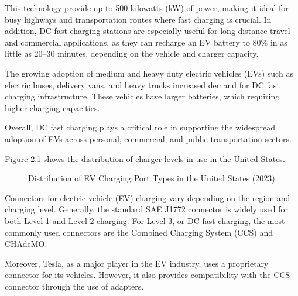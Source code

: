 \begin{itemize}
    
    This technology provide up to 500 kilowatts (kW) of power, making it ideal for busy highways and transportation routes where fast charging is crucial\cite{Alternative Fuels Data Center}.
    In addition, DC fast charging stations are especially useful for long-distance travel and commercial applications, as they can recharge an EV battery to 80\% in as little as 20–30 minutes, depending on the vehicle and charger capacity\cite{Alternative Fuels Data Center}.

    The growing adoption of medium and heavy duty electric vehicles (EVs) such as electric buses, delivery vans, and heavy trucks increased demand for DC fast charging infrastructure. These vehicles have larger batteries, which requiring higher charging capacities. 
    
    Overall, DC fast charging plays a critical role in supporting the widespread adoption of EVs across personal, commercial, and public transportation sectors.
\end{itemize}

Figure 2.1 shows the distribution of charger levels in use in the United States\cite{Alternative Fuels Data Center}.

\begin{figure}[h!]
\centering
{}
\caption{Distribution of EV Charging Port Types in the United States (2023)}
\end{figure}

Connectors for electric vehicle (EV) charging vary depending on the region and charging level. Generally, the standard SAE J1772 connector is widely used for both Level 1 and Level 2 charging. For Level 3, or DC fast charging, the most commonly used connectors are the Combined Charging System (CCS) and CHAdeMO\cite{Alternative Fuels Data Center}.

Moreover, Tesla, as a major player in the EV industry, uses a proprietary connector for its vehicles. However, it also provides compatibility with the CCS connector through the use of adapters\cite{Alternative Fuels Data Center}.

